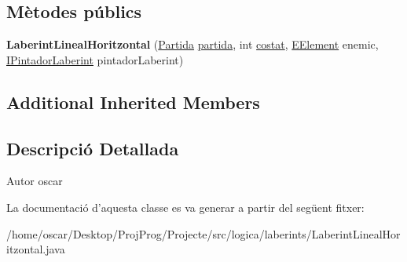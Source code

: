 \subsection*{Mètodes públics}
\begin{DoxyCompactItemize}
\item 
\hypertarget{classlogica_1_1laberints_1_1_laberint_lineal_horitzontal_a3aa38bdd438bdc9db196ae507944e34a}{{\bfseries Laberint\+Lineal\+Horitzontal} (\hyperlink{classlogica_1_1_partida}{Partida} \hyperlink{classlogica_1_1laberints_1_1_laberint_a7183ce070714f73e078bb36e8c21b575}{partida}, int \hyperlink{classlogica_1_1laberints_1_1_laberint_ae874ac4889592b811709f5b967d85286}{costat}, \hyperlink{enumlogica_1_1enumeracions_1_1_e_element}{E\+Element} enemic, \hyperlink{interfaceinterficie_1_1_i_pintador_laberint}{I\+Pintador\+Laberint} pintador\+Laberint)}\label{classlogica_1_1laberints_1_1_laberint_lineal_horitzontal_a3aa38bdd438bdc9db196ae507944e34a}

\end{DoxyCompactItemize}
\subsection*{Additional Inherited Members}


\subsection{Descripció Detallada}
\begin{DoxyAuthor}{Autor}
oscar 
\end{DoxyAuthor}


La documentació d'aquesta classe es va generar a partir del següent fitxer\+:\begin{DoxyCompactItemize}
\item 
/home/oscar/\+Desktop/\+Proj\+Prog/\+Projecte/src/logica/laberints/Laberint\+Lineal\+Horitzontal.\+java\end{DoxyCompactItemize}
